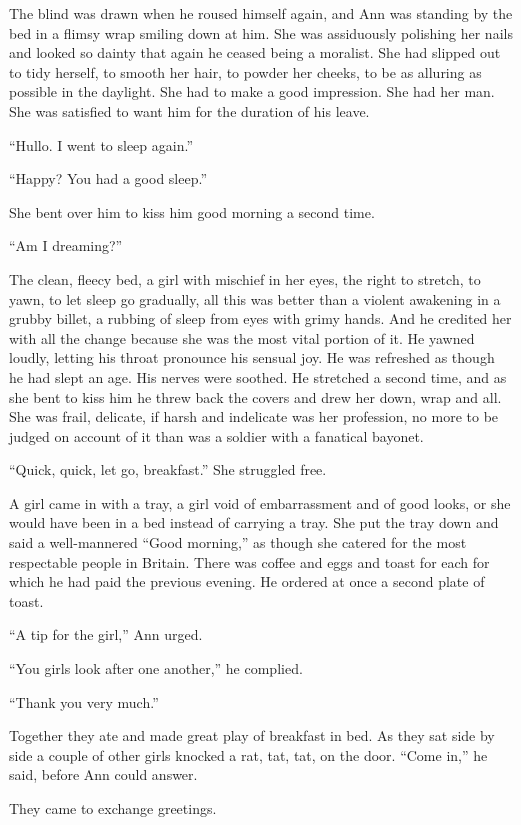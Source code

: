 The blind was drawn when he roused himself again, and Ann was standing by the bed in a flimsy wrap smiling down at him. She was assiduously polishing her nails and looked so dainty that again he ceased being a moralist. She had slipped out to tidy herself, to smooth her hair, to powder her cheeks, to be as alluring as possible in the daylight. She had to make a good impression. She had her man. She was satisfied to want him for the duration of his leave.

``Hullo. I went to sleep again.''

``Happy? You had a good sleep.''

She bent over him to kiss him good morning a second time.

``Am I dreaming?''

The clean, fleecy bed, a girl with mischief in her eyes, the right to stretch, to yawn, to let sleep go gradually, all this was better than a violent awakening in a grubby billet, a rubbing of sleep from eyes with grimy hands. And he credited her with all the change because she was the most vital portion of it. He yawned loudly, letting his throat pronounce his sensual joy. He was refreshed as though he had slept an age. His nerves were soothed. He stretched a second time, and as she bent to kiss him he threw back the covers and drew her down, wrap and all. She was frail, delicate, if harsh and indelicate was her profession, no more to be judged on account of it than was a soldier with a fanatical bayonet.

``Quick, quick, let go, breakfast.'' She struggled free.

A girl came in with a tray, a girl void of embarrassment and of good looks, or she would have been in a bed instead of carrying a tray. She put the tray down and said a well-mannered ``Good morning,'' as though she catered for the most respectable people in Britain. There was coffee and eggs and toast for each for which he had paid the previous evening. He ordered at once a second plate of toast.

``A tip for the girl,'' Ann urged.

``You girls look after one another,'' he complied.

``Thank you very much.''

Together they ate and made great play of breakfast in bed. As they sat side by side a couple of other girls knocked a rat, tat, tat, on the door. ``Come in,'' he said, before Ann could answer.

They came to exchange greetings.

